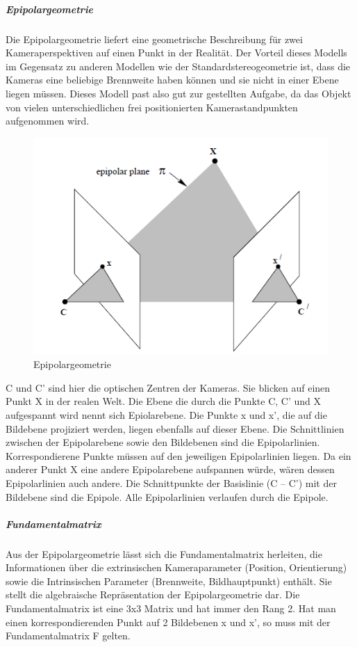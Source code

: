 \subparagraph{Epipolargeometrie}
Die Epipolargeometrie liefert eine geometrische Beschreibung für zwei Kameraperspektiven auf einen Punkt in der Realität. Der Vorteil dieses Modells im Gegensatz zu anderen Modellen wie der Standardstereogeometrie ist, dass die Kameras eine beliebige Brennweite haben können und sie nicht in einer Ebene liegen müssen. Dieses Modell past also gut zur gestellten Aufgabe, da das Objekt von vielen unterschiedlichen frei positionierten Kamerastandpunkten aufgenommen wird.
\begin{figure}[ht]
    \centering
    \includegraphics[scale=0.75]{Figures/Epipolargeomtrie.PNG}
    \caption{Epipolargeometrie \cite{Richard2000}}
\end{figure}
C und C’ sind hier die optischen Zentren der Kameras. Sie blicken auf einen Punkt X in der realen Welt. Die Ebene die durch die Punkte C, C’ und X aufgespannt wird nennt sich Epiolarebene. Die Punkte x und x’, die auf die Bildebene projiziert werden, liegen ebenfalls auf dieser Ebene. Die Schnittlinien zwischen der Epipolarebene sowie den Bildebenen sind die Epipolarlinien. Korrespondierene Punkte müssen auf den jeweiligen Epipolarlinien liegen. Da ein anderer Punkt X eine andere Epipolarebene aufspannen würde, wären dessen Epipolarlinien auch andere. Die Schnittpunkte der Basislinie (C – C’) mit der Bildebene sind die Epipole. Alle Epipolarlinien verlaufen durch die Epipole. \cite{Richard2000}

\subparagraph{Fundamentalmatrix}
Aus der Epipolargeometrie lässt sich die Fundamentalmatrix herleiten, die Informationen über die extrinsischen Kameraparameter (Position, Orientierung) sowie die Intrinsischen Parameter (Brennweite, Bildhauptpunkt) enthält. Sie stellt die algebraische Repräsentation der Epipolargeometrie dar. Die Fundamentalmatrix ist eine 3x3 Matrix und hat immer den Rang 2. Hat man einen korrespondierenden Punkt auf 2 Bildebenen x und x’, so muss mit der Fundamentalmatrix F gelten.
\\

